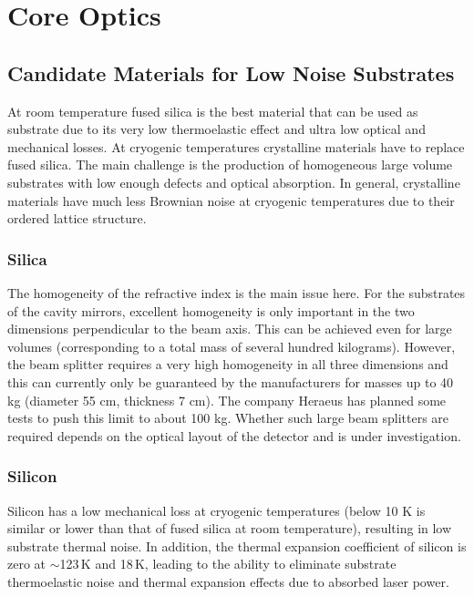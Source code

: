 \chapter{Core Optics}
\label{sec:Appendix_Core_optics}

\section{Candidate Materials for Low Noise Substrates}
At room temperature fused silica is the best material that can be used as substrate due to its very low thermoelastic effect and ultra low optical and mechanical losses.
At cryogenic temperatures crystalline materials have to replace fused silica. The main challenge is the production of homogeneous large volume substrates with low enough defects and optical absorption. In general, crystalline materials have much less Brownian noise at cryogenic temperatures due to their ordered lattice structure.
\subsection{Silica}
The homogeneity of the refractive index is the main issue here. For the substrates of the cavity mirrors, excellent homogeneity is only important in the two dimensions perpendicular to the beam axis. This can be achieved even for large volumes (corresponding to a total mass of several hundred kilograms). However, the beam splitter requires a very high homogeneity in all three dimensions and this can currently only be guaranteed by the manufacturers for masses up to 40 kg (diameter 55 cm, thickness 7 cm). The company Heraeus has planned some tests to push this limit to about 100 kg. Whether such large beam splitters are required depends on the optical layout of the detector and is under investigation.

\subsection{Silicon}
Silicon has a low mechanical loss at cryogenic temperatures (below 10 K is similar or lower than that of fused silica at room temperature), resulting in low substrate thermal noise. In addition, the thermal expansion coefficient of silicon is zero at $\sim$123\,K and 18\,K, leading to the ability to eliminate substrate thermoelastic noise and thermal expansion effects due to absorbed laser power.

